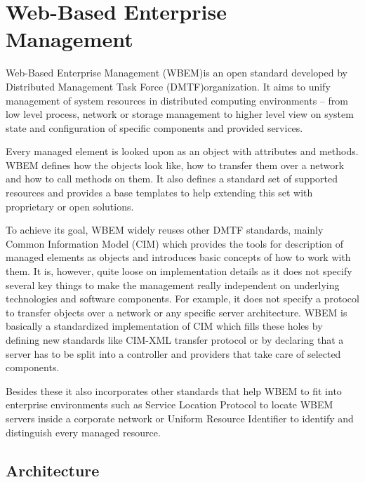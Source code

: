 \chapter{Web-Based Enterprise Management}
\label{chapter:wbem}

Web-Based Enterprise Management (WBEM)\footnotemark is an open standard
developed by Distributed Management Task Force (DMTF)\footnotemark organization.
It aims to unify management of system resources in distributed computing
environments -- from low level process, network or storage management to higher
level view on system state and configuration of specific components and
provided services.

Every managed element is looked upon as an object with attributes and
methods. WBEM defines how the objects look like, how to transfer them over a
network and how to call methods on them. It also defines a standard set of
supported resources and provides a base templates to help extending this
set with proprietary or open solutions.

To achieve its goal, WBEM widely reuses other DMTF standards, mainly Common
Information Model (CIM) which provides the tools for description of managed
elements as objects and introduces basic concepts of how to work with them. It
is, however, quite loose on implementation details as it does not specify
several key things to make the management really independent on underlying
technologies and software components. For example, it does not specify a
protocol to transfer objects over a network or any specific server architecture.
WBEM is basically a standardized implementation of CIM which fills these holes
by defining new standards like CIM-XML transfer protocol or by declaring that a
server has to be split into a controller and providers that take care of
selected components.

Besides these it also incorporates other standards that help WBEM to fit into
enterprise environments such as Service Location Protocol to locate WBEM servers
inside a corporate network or Uniform Resource Identifier to identify and
distinguish every managed resource.


\section{Architecture}
\label{wbem:architecture}

